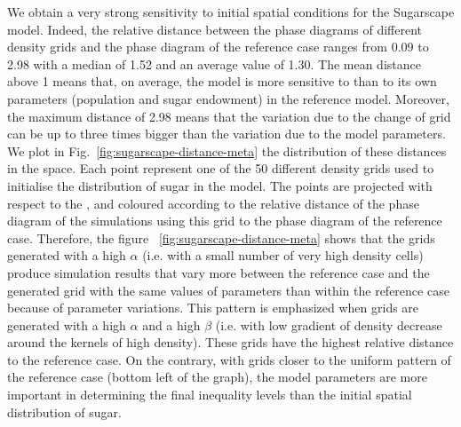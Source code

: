 \documentclass[preprint,5p,times,twocolumn,authoryear]{elsarticle}
\begin{document}
We obtain a very strong sensitivity to initial spatial conditions for the Sugarscape model. Indeed, the relative distance between the phase diagrams of different density grids and the phase diagram of the reference case ranges from 0.09 to 2.98 with a median of 1.52 and an average value of 1.30. The mean distance above 1 means that, on average, the model is more sensitive to  than to its own parameters (population and sugar endowment) in the reference model. Moreover, the maximum distance of 2.98 means that the variation due to the change of grid can be up to three times bigger than the variation due to the model parameters. We plot in Fig.~\ref{fig:sugarscape-distance-meta} the distribution of these distances in the  space. Each point represent one of the 50 different density grids used to initialise the distribution of sugar in the model. The points are projected with respect to the , and coloured according to the relative distance of the phase diagram of the simulations using this grid to the phase diagram of the reference case. Therefore, the figure ~\ref{fig:sugarscape-distance-meta} shows that the grids generated with a high $\alpha$ (i.e. with a small number of very high density cells) produce simulation results that vary more between the reference case and the generated grid with the same values of parameters than within the reference case because of parameter variations. This pattern is emphasized when grids are generated with a high $\alpha$ and a high $\beta$ (i.e. with low gradient of density decrease around the kernels of high density). These grids have the highest relative distance to the reference case. On the contrary, with grids closer to the uniform pattern of the reference case (bottom left of the graph), the model parameters are more important in determining the final inequality levels than the initial spatial distribution of sugar. 
\end{document}
